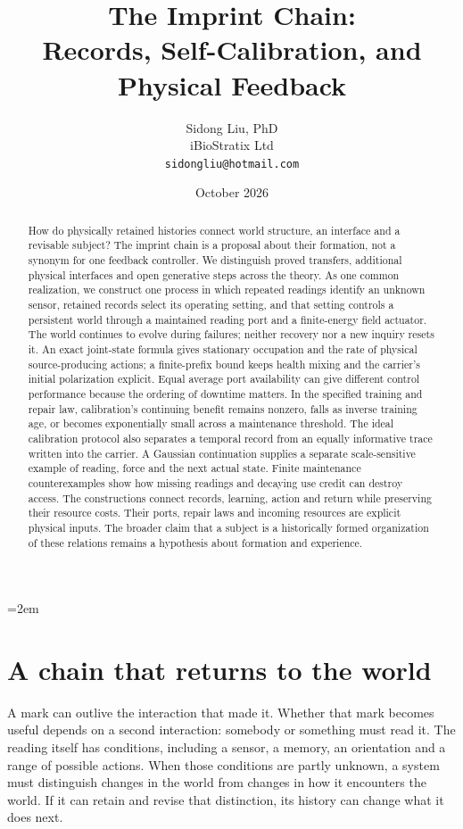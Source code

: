 \documentclass[11pt,a4paper]{article}
\title{The Imprint Chain:\\Records, Self-Calibration, and Physical Feedback}
\author{Sidong Liu, PhD\\iBioStratix Ltd\\\texttt{sidongliu@hotmail.com}}
\date{October 2026}
\begin{document}
\emergencystretch=2em
\raggedbottom
\maketitle

\begin{abstract}
How do physically retained histories connect world structure,
an interface and a revisable subject? The imprint chain is a proposal
about their formation, not a synonym for one feedback controller.
We distinguish proved transfers, additional physical interfaces and
open generative steps across the theory. As one common realization,
we construct one process in which repeated readings
identify an unknown sensor, retained records select its operating
setting, and that setting controls a persistent world through a
maintained reading port and a finite-energy field actuator. The world
continues to evolve during failures; neither recovery nor a new inquiry
resets it. An exact joint-state formula gives stationary occupation and
the rate of physical source-producing actions; a finite-prefix bound
keeps health mixing and the carrier's initial polarization explicit. Equal average port
availability can give different control performance because the
ordering of downtime matters. In the specified training and repair law,
calibration's continuing benefit remains nonzero, falls as inverse
training age, or becomes exponentially small across a maintenance
threshold. The ideal calibration protocol also separates a temporal
record from an equally informative trace written into the carrier.
A Gaussian continuation supplies a separate scale-sensitive example
of reading, force and the next actual state. Finite maintenance
counterexamples show how missing readings and decaying use credit can
destroy access. The constructions connect records, learning, action and
return while preserving their resource costs. Their ports, repair laws
and incoming resources are explicit physical inputs. The broader claim
that a subject is a historically formed organization of these relations
remains a hypothesis about formation and experience.
\end{abstract}
\section{A chain that returns to the world}

A mark can outlive the interaction that made it. Whether that mark becomes useful depends on a second interaction: somebody or something must read it. The reading itself has conditions, including a sensor, a memory, an orientation and a range of possible actions. When those conditions are partly unknown, a system must distinguish changes in the world from changes in how it encounters the world. If it can retain and revise that distinction, its history can change what it does next.
\end{document}
